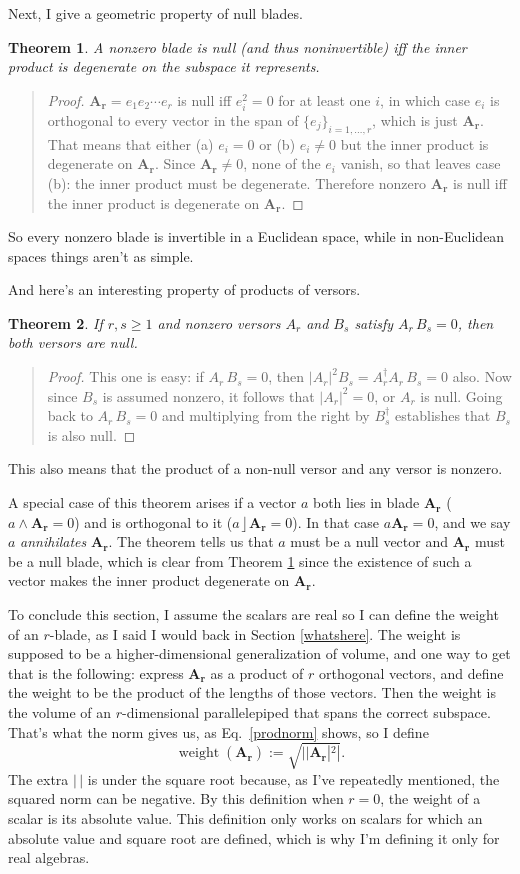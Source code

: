 \documentclass{utarticle}
\newcommand{\bl}[1]{\ensuremath{\bm{#1}}}
\DeclareMathOperator{\lin}{\rfloor}
\DeclareMathOperator{\out}{\wedge}
\newcommand{\rev}[1]{\ensuremath{#1^\dagger}}
\newcommand{\weight}{\operatorname{weight}}
\newtheorem{thm}{Theorem}
\newcommand{\bp}{\begin{quotation} \begin{proof}}
\newcommand{\ep}{\end{proof} \end{quotation}}
\begin{document}
Next, I give a geometric property of null blades.
\begin{thm}
A nonzero blade is null (and thus noninvertible) iff the inner product is 
degenerate on the subspace it represents.
\label{nulleqdegen}
\end{thm}
\bp
$\bl{A_r} = e_1 e_2 \dotsb e_r$ is null iff $e_i^2=0$ for at least one $i$, in 
which case $e_i$ is orthogonal to every vector in the span of $\{e_j\}_{i=1,\dotsc,r}$, 
which is just \bl{A_r}.  That means that either (a) $e_i=0$ or (b) $e_i \neq 0$ 
but the inner product is degenerate on \bl{A_r}.  Since $\bl{A_r} \neq 0$, none of 
the $e_i$ vanish, so that leaves case (b): the inner product must
be degenerate.  Therefore nonzero \bl{A_r} is null iff the inner product is 
degenerate on \bl{A_r}.
\ep
So every nonzero blade is invertible in a Euclidean space, while in non-Euclidean
spaces things aren't as simple.

And here's an interesting property of products of versors.
\begin{thm}
If $r, s \geq 1$ and nonzero versors $A_r$ and $B_s$ satisfy $A_r\,B_s = 0$, then 
both versors are null.
\label{prodnonzeroiszero}
\end{thm}  
\bp
This one is easy: if $A_r\,B_s = 0$, then $|A_r|^2 B_s = \rev{A_r}A_r\,B_s = 0$ also.  
Now since $B_s$ is assumed nonzero, it follows that $|A_r|^2 = 0$, or $A_r$ is 
null.  Going back to $A_r\,B_s = 0$ and multiplying from the right by \rev{B_s} 
establishes that $B_s$ is also null.
\ep
This also means that the product of a non-null versor and any versor is nonzero.

A special case of this theorem arises if a vector $a$ both lies in blade \bl{A_r}
($a \out \bl{A_r} = 0$) and is orthogonal to it ($a \lin \bl{A_r} = 0$).  In that case 
$a \bl{A_r} = 0$, and we say $a$ \emph{annihilates} \bl{A_r}.  The theorem tells us 
that $a$ must be a null vector and \bl{A_r} must be a null blade, which is clear 
from Theorem \ref{nulleqdegen} since the existence of such a vector makes the
inner product degenerate on \bl{A_r}.

To conclude this section, I assume the scalars are real so I can define the weight 
of an $r$-blade, as I said I would back in Section \ref{whatshere}.  The 
weight is supposed to be a higher-dimensional generalization of volume, and one 
way to get that is the following: express \bl{A_r} as a product of $r$ orthogonal 
vectors, and define the weight to be the product of the lengths of those vectors.  
Then the weight is the volume of an $r$-dimensional parallelepiped that spans the 
correct subspace.  That's what the norm gives us, as Eq.~\eqref{prodnorm} shows, 
so I define
\begin{equation} \weight(\bl{A_r}) := \sqrt{||\bl{A_r}|^2|}. \label{weightdef} \end{equation}
The extra $|\,|$ is under the square root because, as I've repeatedly mentioned,
the squared norm can be negative.  By this definition when $r=0$, the weight of a 
scalar is its absolute value.  This definition only works on scalars for which an 
absolute value and square root are defined, which is why I'm defining it only for 
real algebras.
\end{document}
